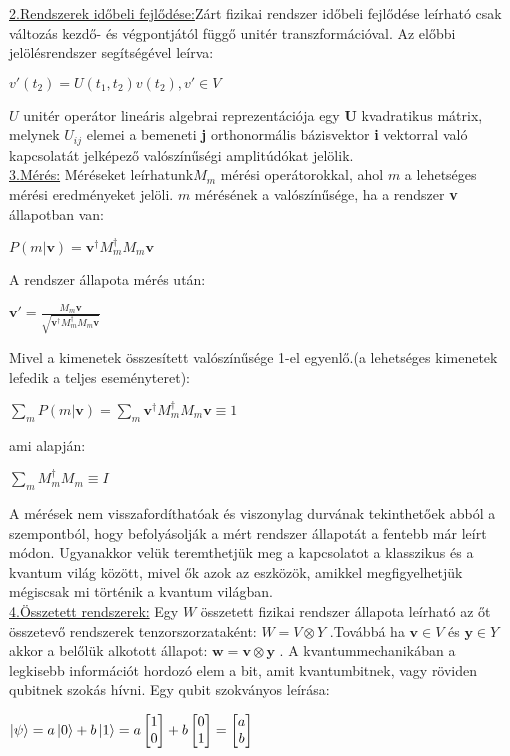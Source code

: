 \underline{2.Rendszerek időbeli fejlődése:}Zárt fizikai rendszer időbeli fejlődése leírható csak változás kezdő- és végpontjától függő unitér transzformációval. Az előbbi jelölésrendszer segítségével leírva: 
\begin{center}
$v'(t_2) = U(t_1,t_2)v(t_2), v' \in V$
\end{center}
$ U $ unitér operátor lineáris algebrai reprezentációja egy \textbf{U} kvadratikus mátrix, melynek $U_{ij}$ elemei a bemeneti \textbf{j} orthonormális bázisvektor \textbf{i} vektorral való kapcsolatát jelképező valószínűségi amplitúdókat jelölik.\\

\underline{3.Mérés:} Méréseket leírhatunk$M_m$  mérési operátorokkal, ahol $m$ a lehetséges mérési eredményeket jelöli. $m$ mérésének a valószínűsége, ha a rendszer \textbf{v} állapotban van:
\begin{center}
$P(m|\textbf{v})= {\textbf{v}}^\dagger M_m^\dagger M_m \textbf{v} $
\end{center}
A rendszer állapota mérés után:
\begin{center}
$ {\textbf{v}}' = \frac{M_m \textbf{v}}{\sqrt{{\textbf{v}}^\dagger M_m^\dagger M_m \textbf{v}}}  $
\end{center}
Mivel a kimenetek összesített valószínűsége 1-el egyenlő.(a lehetséges kimenetek lefedik a teljes eseményteret):
\begin{center}
$ \sum_m P(m|\textbf{v}) = \sum_m {\textbf{v}}^\dagger M_m^\dagger M_m \textbf{v} \equiv 1$
\end{center}
ami alapján:
\begin{center}
$\sum_m M_m^\dagger M_m \equiv I $
\end{center}
A mérések nem visszafordíthatóak és viszonylag durvának tekinthetőek abból a szempontból, hogy befolyásolják a mért rendszer állapotát a fentebb már leírt módon. Ugyanakkor velük teremthetjük meg a kapcsolatot a klasszikus és a kvantum világ között, mivel ők azok az eszközök,  amikkel megfigyelhetjük mégiscsak mi történik a kvantum világban.
\\
\underline{4.Összetett rendszerek:}
Egy $ W $ összetett fizikai rendszer állapota leírható az őt összetevő rendszerek tenzorszorzataként:
$ W=V \otimes Y $ .Továbbá ha $\textbf{v} \in V  $  és  $ \textbf{y} \in Y $ akkor a belőlük alkotott állapot: $ \textbf{w}=\textbf{v}\otimes \textbf{y} $ .
A kvantummechanikában a legkisebb információt hordozó elem a bit, amit kvantumbitnek, vagy röviden qubitnek  szokás hívni. Egy qubit szokványos leírása:
\begin{center}
$ \ket{\psi}=a\ket{0}+b\ket{1}=a \begin{bmatrix}1\\0\end{bmatrix}+ b \begin{bmatrix}0\\1\end{bmatrix} = \begin{bmatrix} a\\b \end{bmatrix} $
\end{center}
